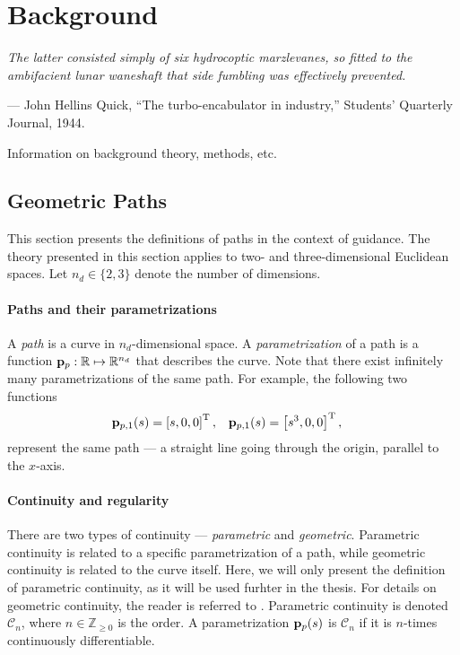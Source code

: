 \chapter{Background}
\label{chap:background}

\setlength{\epigraphwidth}{0.7\textwidth}
\epigraph{ \it
    The latter consisted simply of six hydrocoptic marzlevanes, so fitted to the ambifacient lunar waneshaft that side fumbling was effectively prevented.
}{--- John Hellins Quick, ``The turbo-encabulator in industry,'' Students' Quarterly Journal, 1944.}

Information on background theory, methods, etc.

\section{Geometric Paths}
\label{sec:background_paths}

This section presents the definitions of paths in the context of guidance.
The theory presented in this section applies to two- and three-dimensional Euclidean spaces.
Let $n_d \in \{2,3\}$ denote the number of dimensions.

\subsubsection*{Paths and their parametrizations}
A \emph{path} is a curve in $n_d$-dimensional space.
A \emph{parametrization} of a path is a function $\mathbf{p}_p : \mathbb{R} \mapsto \mathbb{R}^{n_d}$ that describes the curve.
Note that there exist infinitely many parametrizations of the same path.
For example, the following two functions
\begin{align}
    \mathbf{p}_{p, 1}(s) &= \left[s, 0, 0\right]^{\mathrm{T}}, &
    \mathbf{p}_{p, 1}(s) &= \left[s^3, 0, 0\right]^{\mathrm{T}}, &
\end{align}
represent the same path --- a straight line going through the origin, parallel to the $x$-axis.

\subsubsection*{Continuity and regularity}
There are two types of continuity --- \emph{parametric} and \emph{geometric}.
Parametric continuity is related to a specific parametrization of a path, while geometric continuity is related to the curve itself.
Here, we will only present the definition of parametric continuity, as it will be used furhter in the thesis.
For details on geometric continuity, the reader is referred to \cite{barsky_geometric_1984}.
Parametric continuity is denoted $\mathcal{C}_n$, where $n \in \mathbb{Z}_{\geq 0}$ is the order.
A parametrization $\mathbf{p}_p(s)$ is $\mathcal{C}_n$ if it is $n$-times continuously differentiable.


